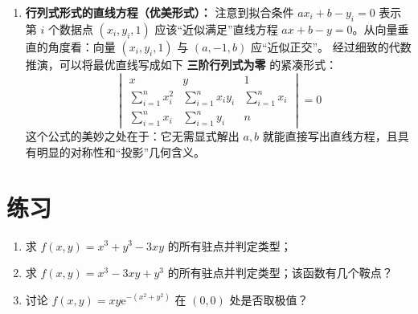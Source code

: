 \documentclass[lang=cn,11pt]{elegantbook}
\begin{document}
\begin{solution}
\begin{enumerate}
  \item \textbf{行列式形式的直线方程（优美形式）：}
  注意到拟合条件 $ax_i+b-y_i=0$ 表示第 $i$ 个数据点 $(x_i,y_i,1)$ 应该“近似满足”直线方程 $ax+b-y=0$。从向量垂直的角度看：向量 $(x_i,y_i,1)$ 与 $(a,-1,b)$ 应“近似正交”。
  经过细致的代数推演，可以将最优直线写成如下 \textbf{三阶行列式为零} 的紧凑形式：
  \[
  \begin{vmatrix}
  x & y & 1\\
  \sum\limits_{i=1}^{n}x_i^2 &
  \sum\limits_{i=1}^{n}x_iy_i &
  \sum\limits_{i=1}^{n}x_i\\[10pt]
  \sum\limits_{i=1}^{n}x_i &
  \sum\limits_{i=1}^{n}y_i & n
  \end{vmatrix}=0
  \]
  这个公式的美妙之处在于：它无需显式解出 $a,b$ 就能直接写出直线方程，且具有明显的对称性和“投影”几何含义。
\end{enumerate}
\end{solution}


\section{练习}

\begin{exercise}[基础：求驻点与极值判定]
\begin{enumerate}
  \item[(1)] 求 $f(x,y)=x^3+y^3-3xy$ 的所有驻点并判定类型；
  \item[(2)] 求 $f(x,y)=x^3-3xy+y^3$ 的所有驻点并判定类型；该函数有几个鞍点？
  \item[(3)] 讨论 $f(x,y)=xy\mathrm{e}^{-(x^2+y^2)}$ 在 $(0,0)$ 处是否取极值？
\end{enumerate}
\end{exercise}
\end{document}
